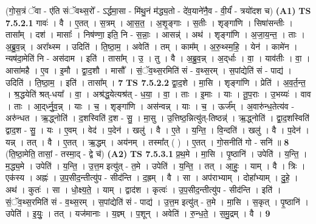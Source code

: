 \documentclass[17pt]{extarticle}
\begin{document}
                  \newline
                      (गो॒स॒त्रं ॅवा - ए॑ति संॅवथ्स॒रो᳚ - ऽर्द्धमा॒सा - मि॑थु॒नं म॑द्ध्य॒तो - दे॑व॒याने॑नै॒व - वी॒र्यं॑ - त्रयो॑दश च)  \textbf{(A1)} \newline \newline
                                \textbf{ TS 7.5.2.1} \newline
                  गावः॑ । वै । ए॒तत् । स॒त्रम् । आ॒स॒त॒ । अ॒शृ॒ङ्गाः । स॒तीः । शृङ्गा॑णि । सिषा॑सन्तीः । तासा᳚म् । दश॑ । मासाः᳚ । निष॑ण्णा॒ इति॒ नि - स॒न्नाः॒ । आसन्न्॑ । अथ॑ । शृङ्गा॑णि । अ॒जा॒य॒न्त॒ । ताः । अ॒ब्रु॒व॒न्न् । अरा᳚थ्स्म । उदिति॑ । ति॒ष्ठा॒म॒ । अवेति॑ । तम् । काम᳚म् । अ॒रु॒थ्स्म॒हि॒ । येन॑ । कामे॑न । न्यष॑दा॒मेति॑ नि - अस॑दाम । इति॑ । तासा᳚म् । उ॒ । तु । वै । अ॒ब्रु॒व॒न्न् । अ॒द्‌र्धाः । वा॒ । याव॑तीः । वा॒ । आसा॑महै । ए॒व । इ॒मौ । द्वा॒द॒शौ । मासौ᳚ । सं॒ॅव॒थ्स॒रमिति॑ सं - व॒थ्स॒रम् । स॒पांद्येति॑ सं - पाद्य॑ । उदिति॑ । ति॒ष्ठा॒म॒ । इति॑ । तासा᳚म् । \textbf{  7} \newline
                  \newline
                                \textbf{ TS 7.5.2.2} \newline
                  द्वा॒द॒शे । मा॒सि । शृङ्गा॑णि । प्रेति॑ । अ॒व॒र्त॒न्त॒ । श्र॒द्धयेति॑ श्रत्-धया᳚ । वा॒ । अश्र॑द्ध॒येत्यश्र॑त् - ध॒या॒ । वा॒ । ताः । इ॒माः । याः । तू॒प॒राः । उ॒भय्यः॑ । वाव । ताः । आ॒द्‌र्ध्नु॒व॒न्न् । याः । च॒ । शृङ्गा॑णि । अस॑न्वन्न् । याः । च॒ । ऊर्ज᳚म् । अ॒वारु॑न्ध॒तेत्य॑व - अरु॑न्धत । ऋ॒द्ध्नोति॑ । द॒शस्विति॑ द॒श - सु॒ । मा॒सु । उ॒त्तिष्ठ॒न्नित्यु॑त्-तिष्ठन्न्॑ । ऋ॒द्ध्नोति॑ । द्वा॒द॒शस्विति॑ द्वाद॒श - सु॒ । यः । ए॒वम् । वेद॑ । प॒देन॑ । खलु॑ । वै । ए॒ते । य॒न्ति॒ । वि॒न्दति॑ । खलु॑ । वै । प॒देन॑ । यन्न् । तत् । वै । ए॒तत् । ऋ॒द्धम् । अय॑नम् । तस्मा᳚त् ( ) । ए॒तत् । गो॒सनीति॑ गो - सनि॑ ॥ \textbf{  8} \newline
                  \newline
                      (ति॒ष्ठा॒मेति॒ तासां॒ - तस्मा॒द् - द्वे च॑)  \textbf{(A2)} \newline \newline
                                \textbf{ TS 7.5.3.1} \newline
                  प्र॒थ॒मे । मा॒सि । पृ॒ष्ठानि॑ । उपेति॑ । य॒न्ति॒ । म॒द्ध्य॒मे । उपेति॑ । य॒न्ति॒ । उ॒त्त॒म इत्यु॑त् - त॒मे । उपेति॑ । य॒न्ति॒ । तत् । आ॒हुः॒ । याम् । वै । त्रिः । एक॑स्य । अह्नः॑ । उ॒प॒सीद॒न्तीत्यु॑प - सीद॑न्ति । द॒ह्रम् । वै । सा । अप॑राभ्याम् । दोहा᳚भ्याम् । दु॒हे॒ । अथ॑ । कुतः॑ । सा । धो॒क्ष्य॒ते॒ । याम् । द्वाद॑श । कृत्वः॑ । उ॒प॒सीद॒न्तीत्यु॑प - सीद॑न्ति । इति॑ । सं॒ॅव॒थ्स॒रमिति॑ सं - व॒थ्स॒रम् । स॒पांद्येति॑ सं - पाद्य॑ । उ॒त्त॒म इत्यु॑त् - त॒मे । मा॒सि । स॒कृत् । पृ॒ष्ठानि॑ । उपेति॑ । इ॒युः॒ । तत् । यज॑मानाः । य॒ज्ञ्म् । प॒शून् । अवेति॑ । रु॒न्ध॒ते॒ । स॒मु॒द्रम् । वै । \textbf{  9} \newline
\end{document}
